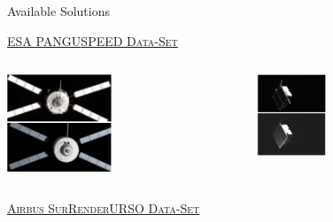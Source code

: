 \documentclass[10pt]{beamer}
\begin{document}
\begin{frame}{Available Solutions}

  \bigskip

  \begin{overlayarea}{\textwidth}{0.8\textheight}

    \centering

    \textsc{\ul{ESA PANGU}}\hspace{2.8cm}\textsc{\ul{SPEED Data-Set}}

    \begin{columns}[T,onlytextwidth]
      \hspace{1.6cm}
      \begin{column}{0.5\textwidth}
        \includegraphics[width=0.45\textwidth]{gfx/pangu3.eps}
      \end{column}
      \hspace{-0.78cm}
      \begin{column}{0.5\textwidth}
        \includegraphics[width=0.35\textwidth]{gfx/speed.eps}
      \end{column}
    \end{columns}

    \vspace{0.3cm}

    \hspace{-0.25cm}\textsc{\ul{Airbus SurRender}}\hspace{1.8cm}\textsc{\ul{URSO Data-Set}}


\end{overlayarea}
\end{frame}
\end{document}
